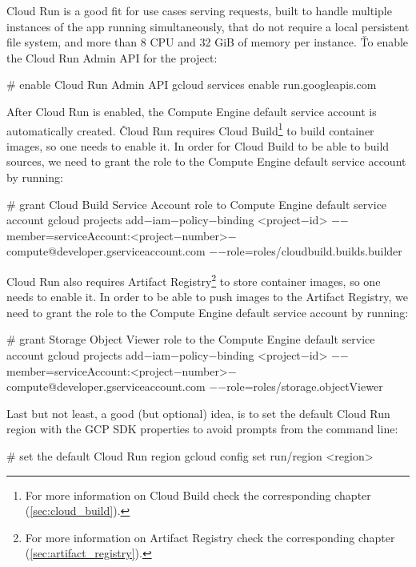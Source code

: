 Cloud Run is a good fit for use cases serving requests, built to handle multiple instances of the app running
simultaneously, that do not require a local persistent file system, and more than 8 CPU and 32 GiB of memory per
instance. \v

To enable the Cloud Run Admin API for the project:
\begin{bash}
# enable Cloud Run Admin API
gcloud services enable run.googleapis.com
\end{bash}

After Cloud Run is enabled, the Compute Engine default service account is automatically created. \v

Cloud Run requires Cloud Build\footnote{For more information on Cloud Build check the corresponding chapter
(\ref{sec:cloud_build}).} to build container images, so one needs to enable it. In order for Cloud Build to be able to
build sources, we need to grant the  role to the Compute Engine default service
account by running:
\begin{bash}
# grant Cloud Build Service Account role to Compute Engine default service account
gcloud projects add$-$iam$-$policy$-$binding <project$-$id>
    $-$$-$member=serviceAccount:<project$-$number>$-$compute@developer.gserviceaccount.com
    $-$$-$role=roles/cloudbuild.builds.builder
\end{bash}

Cloud Run also requires Artifact Registry\footnote{For more information on Artifact Registry check the corresponding
chapter (\ref{sec:artifact_registry}).} to store container images, so one needs to enable it. In order to be able to
push images to the Artifact Registry, we need to grant the  role to the Compute Engine
default service account by running:
\begin{bash}
# grant Storage Object Viewer role to the Compute Engine default service account
gcloud projects add$-$iam$-$policy$-$binding <project$-$id>
    $-$$-$member=serviceAccount:<project$-$number>$-$compute@developer.gserviceaccount.com
    $-$$-$role=roles/storage.objectViewer
\end{bash}

Last but not least, a good (but optional) idea, is to set the default Cloud Run region with the GCP SDK properties to
avoid prompts from the command line:
\begin{bash}
# set the default Cloud Run region
gcloud config set run/region <region>
\end{bash}

